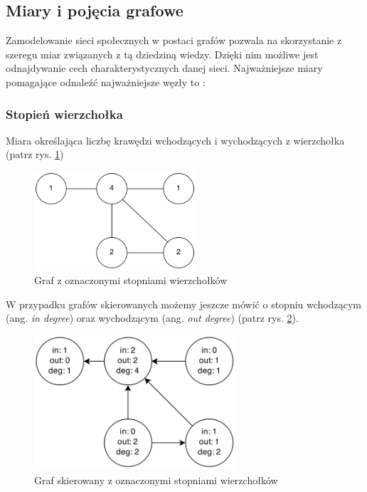 \subsection{Miary i pojęcia grafowe}
Zamodelowanie sieci społecznych w postaci grafów pozwala na skorzystanie z szeregu
miar związanych z tą dziedziną wiedzy. Dzięki nim możliwe jest odnajdywanie cech
charakterystycznych danej sieci. Najważniejsze miary pomagające odnaleźć najważniejsze
węzły to \cite{estrada}: 


\subsubsection{Stopień wierzchołka}
Miara określająca liczbę krawędzi wchodzących i 
  wychodzących z wierzchołka (patrz rys. \ref{image:stopien-wierzcholka})
  
\begin{figure}[ht!]
\centering
\includegraphics[width=60mm]{img/stopien-wierzcholka.png}
\caption{Graf z oznaczonymi stopniami wierzchołków}
\label{image:stopien-wierzcholka}
\end{figure}

W przypadku grafów skierowanych możemy jeszcze mówić o stopniu wchodzącym 
(ang. \textit{in degree}) oraz wychodzącym (ang. \textit{out degree}) 
(patrz rys. \ref{image:stopien-wierzcholka-skierowany}).
  
\begin{figure}[ht!]
\centering
\includegraphics[width=75mm]{img/stopien-wierzcholka-skierowany.png}
\caption{Graf skierowany z oznaczonymi stopniami wierzchołków}
\label{image:stopien-wierzcholka-skierowany}
\end{figure}
  
